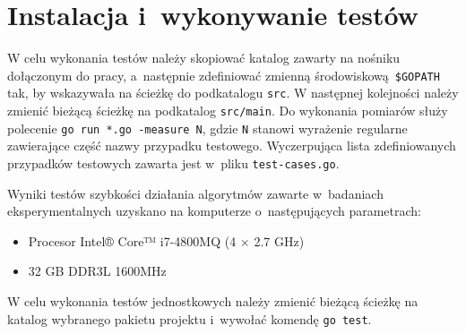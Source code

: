 \section{Instalacja i~wykonywanie testów}
\par{
  W celu wykonania testów należy skopiować katalog zawarty na nośniku dołączonym do pracy, a~następnie zdefiniować zmienną środowiskową \texttt{\$GOPATH} tak, by wskazywała na ścieżkę do podkatalogu \texttt{src}.
  W następnej kolejności należy zmienić bieżącą ścieżkę na podkatalog \texttt{src/main}.
  Do wykonania pomiarów służy polecenie \texttt{go run *.go -measure N}, gdzie \texttt{N} stanowi wyrażenie regularne zawierające część nazwy przypadku testowego.
  Wyczerpująca lista zdefiniowanych przypadków testowych zawarta jest w~pliku \texttt{test-cases.go}.

  Wyniki testów szybkości działania algorytmów zawarte w~badaniach eksperymentalnych uzyskano na komputerze o~następujących parametrach:
  \begin{itemize}
    \item Procesor Intel® Core™ i7-4800MQ (4 $\times$ 2.7 GHz)
    \item 32 GB DDR3L 1600MHz
  \end{itemize}

  W celu wykonania testów jednostkowych należy zmienić bieżącą ścieżkę na katalog wybranego pakietu projektu i~wywołać komendę \texttt{go test}.
}
